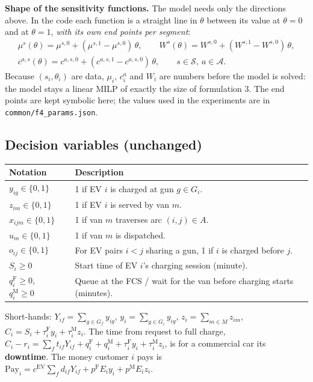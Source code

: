 \documentclass[12pt,a4paper]{article}
\begin{document}
\textbf{Shape of the sensitivity functions.} The model needs only the directions above. In the code each function is a straight line in $\theta$ between its value at $\theta=0$ and at $\theta=1$, \emph{with its own end points per segment}:
\begin{gather*}
\mu^{s}(\theta)=\mu^{s,0}+(\mu^{s,1}-\mu^{s,0})\,\theta,\qquad
W^{s}(\theta)=W^{s,0}+(W^{s,1}-W^{s,0})\,\theta,\\
c^{a,s}(\theta)=c^{a,s,0}+(c^{a,s,1}-c^{a,s,0})\,\theta,\qquad s\in\mathcal S,\ a\in\mathcal A .
\end{gather*}
Because $(s_i,\theta_i)$ are data, $\mu_i$, $c^{a}_i$ and $W_i$ are numbers before the model is solved: the model stays a linear MILP of exactly the size of formulation 3. The end points are kept symbolic here; the values used in the experiments are in \texttt{common/f4\_params.json}.

\subsection*{Decision variables (unchanged)}
\begin{tabularx}{\textwidth}{@{}>{\raggedright\arraybackslash}p{4.6cm}X@{}}
\toprule
\textbf{Notation} & \textbf{Description} \\
\midrule
$y_{ig}\in\{0,1\}$ & 1 if EV $i$ is charged at gun $g\in G_i$. \\[2pt]
$z_{im}\in\{0,1\}$ & 1 if EV $i$ is served by van $m$. \\[2pt]
$x_{ijm}\in\{0,1\}$ & 1 if van $m$ traverses arc $(i,j)\in A$. \\[2pt]
$u_m\in\{0,1\}$ & 1 if van $m$ is dispatched. \\[2pt]
$o_{ij}\in\{0,1\}$ & For EV pairs $i<j$ sharing a gun, 1 if $i$ is charged before $j$. \\[2pt]
$S_i\ge0$ & Start time of EV $i$'s charging session (minute). \\[2pt]
$q^{\mathrm F}_i\ge0$,\ \ $q^{\mathrm M}_i\ge0$ & Queue at the FCS / wait for the van before charging starts (minutes). \\
\bottomrule
\end{tabularx}

Short-hands: $Y_{if}=\sum_{g\in G_f}y_{ig}$, $y_i=\sum_{g\in G_i}y_{ig}$, $z_i=\sum_{m\in M}z_{im}$, $C_i=S_i+\tau^{\mathrm F}_i y_i+\tau^{\mathrm M}_i z_i$. The time from request to full charge, $C_i-r_i=\sum_{f}t_{if}Y_{if}+q^{\mathrm F}_i+q^{\mathrm M}_i+\tau^{\mathrm F}_iy_i+\tau^{\mathrm M}_iz_i$, is for a commercial car its \textbf{downtime}. The money customer $i$ pays is $\text{Pay}_i=c^{\mathrm{EV}}\sum_{f}d_{if}Y_{if}+p^{\mathrm F}E_iy_i+p^{\mathrm M}E_iz_i$.
\end{document}
